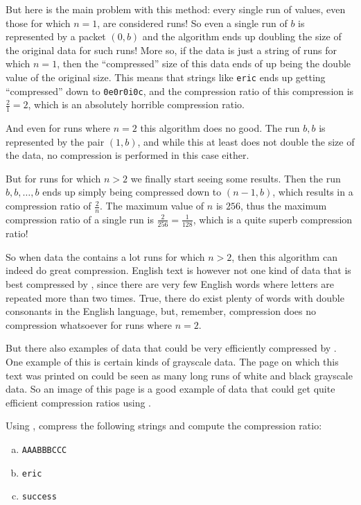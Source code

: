 But here is the main problem with this method: every single run of
values, even those for which $n=1$, are considered runs! So even a
single run of $b$ is represented by a packet $(0,b)$ and the algorithm
ends up doubling the size of the original data for such runs! More so,
if the data is just a string of runs for which $n=1$, then the
``compressed'' size of this data ends of up being the double value of
the original size. This means that strings like \texttt{eric} ends up
getting ``compressed'' down to \texttt{0e0r0i0c}, and the compression ratio
of this compression is $\frac{2}{1} = 2$, which is an absolutely
horrible compression ratio.

And even for runs where $n=2$ this algorithm does no good. The run
$b,b$ is represented by the pair $(1,b)$, and while this at least
does not double the size of the data, no compression is performed in
this case either.

But for runs for which $n > 2$ we finally start seeing some
results. Then the run $b, b, \dots, b$ ends up simply being compressed
down to $(n-1,b)$, which results in a compression ratio of
$\frac{2}{n}$. The maximum value of $n$ is $256$, thus the maximum
compression ratio of a single run is $\frac{2}{256} = \frac{1}{128}$,
which is a quite superb compression ratio!

So when data the contains a lot runs for which $n > 2$, then this
algorithm can indeed do great compression. English text is however not
one kind of data that is best compressed by \rle, since there are very
few English words where letters are repeated more than two
times. True, there do exist plenty of words with double consonants in
the English language, but, remember, \rle compression does no
compression whatsoever for runs where $n=2$.

But there also examples of data that could be very efficiently
compressed by \rle. One example of this is certain kinds of grayscale
data. The page on which this text was printed on could be seen as many
long runs of white and black grayscale data. So an image of this page
is a good example of data that could get quite efficient compression
ratios using \rle.

\begin{Exercise}[label={rle-compression}]
  Using \rle, compress the following strings and compute the
  compression ratio:

  \begin{enumerate}[(a)]
  \item \texttt{AAABBBCCC}
  \item \texttt{eric}
  \item \texttt{success}
  \end{enumerate}

\end{Exercise}

